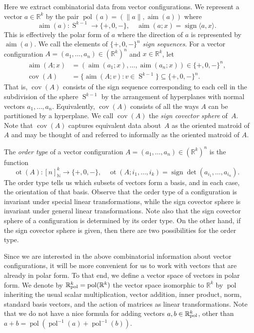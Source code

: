 \documentclass[11pt]{article}
\numberwithin{equation}{section}
\theoremstyle{remark}
\let\mb\mathbb
\let\df\emph
\DeclareMathOperator{\sign}{sign}
\DeclareMathOperator{\sphere}{S}
\newcommand{\Rpol}[1]{\mb{R}\mathrlap{{}^{#1}}{}_\text{pol}}
\DeclareMathOperator{\pol}{pol}
\DeclareMathOperator{\aim}{aim}
\DeclareMathOperator{\cov}{cov}
\DeclareMathOperator{\ot}{ot}
\begin{document}
Here we extract combinatorial data from vector configurations.
We represent a vector $a \in \mb{R}^k$ by the pair $\pol(a) = (\|a\|,\aim (a))$ where
\[ \aim (a) : \sphere^{k-1} \to \{+,0,-\}, \quad \aim (a; x) = \sign \langle a,x \rangle.\]
This is effectively the polar form of $a$ where the direction of $a$ is represented by $\aim(a)$.
We call the elements of $\{+,0,-\}^n$ \df{sign sequences}.
For a vector configuration $A = (a_1,\dots,a_n) \in (\mb{R}^k)^n$ and $x \in \mb{R}^k$, let
\begin{align*}
\aim (A;x) &= (\aim(a_1;x),\dots,\aim(a_n;x)) \in \{+,0,-\}^n, \\
\cov (A) &= \bigl\{ \aim (A; v) :v \in \sphere^{k-1} \bigr\} \subseteq \{+,0,-\}^n.
\end{align*}
That is, $\cov(A)$ consists of the sign sequence corresponding to each cell in the subdivision of the sphere $\sphere^{k-1}$ by the arrangement of hyperplanes with normal vectors $a_1,\dots,a_n$.
Equivalently, $\cov(A)$ consists of all the ways $A$ can be partitioned by a hyper\-plane.
We call $\cov(A)$ the \df{sign covector sphere} of~$A$.
Note that $\cov(A)$ captures equivalent data about~$A$ as the oriented matroid of $A$ and may be thought of and referred to informally as the oriented matroid of $A$.

The \df{order type} of a vector configuration $A = (a_1,\dots,a_n) \in (\mb{R}^k)^n$ is the function
\[ \ot(A): [n]_\mb{N}^k \to \{+,0,-\}, \quad \ot(A;i_1,\dots,i_k) = \sign\det(a_{i_1},\dots,a_{i_n}). \]
The order type tells us which subsets of vectors form a basis, and in each case, the orientation of that basis.
Observe that the order type of a configuration is invariant under special linear transformations, while the sign covector sphere is invariant under general linear transformations.
Note also that the sign covector sphere of a configuration is determined by its order type. On the other hand, if the sign covector sphere is given, then there are two possibilities for the order type.

Since we are interested in the above combinatorial information about vector configurations, it will be more convenient for us to work with vectors that are already in polar form. To that end, we define a vector space of vectors in polar form.
We denote by $\Rpol{k} = \pol(\mb{R}^k)$ the vector space isomorphic to $\mb{R}^k$ by $\pol$ inheriting the usual scalar multiplication, vector addition, inner product, norm, standard basis vectors, and the action of matrices as linear transformations. Note that we do not have a nice formula for adding vectors $a,b \in \Rpol{k}$, other than $a+b = \pol(\pol^{-1}(a)+\pol^{-1}(b))$.
\end{document}
